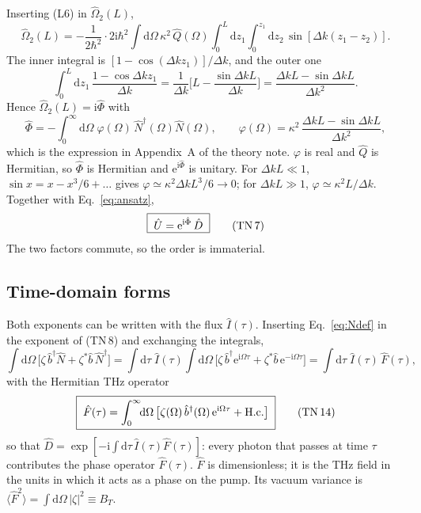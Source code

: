 \documentclass[aps,pra,onecolumn,notitlepage,11pt,amsmath,amssymb,nofootinbib]{revtex4-2}
\newcommand{\Nop}{\hat N}
\newcommand{\Iop}{\hat I}
\newcommand{\Qop}{\hat Q}
\newcommand{\dd}{\mathrm{d}}
\newcommand{\ee}{\mathrm{e}}
\newcommand{\ii}{\mathrm{i}}
\newcommand{\TN}[1]{\text{TN\,#1}}
\begin{document}
Inserting (L6) in $\hat\Omega_2(L)$,
\begin{equation}
\hat\Omega_2(L)=-\frac{1}{2\hbar^2}\cdot2\ii\hbar^2\!\int\!\dd\Omega\,\kappa^2\,\Qop(\Omega)
\int_0^L\!\!\dd z_1\!\int_0^{z_1}\!\!\dd z_2\,\sin[\Delta k(z_1-z_2)] .
\end{equation}
The inner integral is $[1-\cos(\Delta kz_1)]/\Delta k$, and the outer one
\begin{equation}
\int_0^L\!\!\dd z_1\,\frac{1-\cos\Delta kz_1}{\Delta k}
=\frac{1}{\Delta k}\Big[L-\frac{\sin\Delta kL}{\Delta k}\Big]
=\frac{\Delta kL-\sin\Delta kL}{\Delta k^2}.
\end{equation}
Hence $\hat\Omega_2(L)=\ii\hat\Phi$ with
\begin{equation}
\hat\Phi=-\int_0^\infty\!\!\dd\Omega\;\varphi(\Omega)\,\Nop^\dagger(\Omega)\Nop(\Omega),
\qquad
\varphi(\Omega)=\kappa^2\,\frac{\Delta kL-\sin\Delta kL}{\Delta k^2},
\label{eq:Phi}
\end{equation}
which is the expression in Appendix~A of the theory note. $\varphi$ is real
and $\Qop$ is Hermitian, so $\hat\Phi$ is Hermitian and $\ee^{\ii\hat\Phi}$ is
unitary. For $\Delta kL\ll1$, $\sin x=x-x^3/6+\dots$ gives
$\varphi\simeq\kappa^2\Delta kL^3/6\to0$; for $\Delta kL\gg1$,
$\varphi\simeq\kappa^2L/\Delta k$. Together with Eq.~\eqref{eq:ansatz},
\begin{equation}
\boxed{\;\hat U=\ee^{\ii\hat\Phi}\,\hat D\;}
\tag{\TN{7}}
\end{equation}
The two factors commute, so the order is immaterial.

\subsection{Time-domain forms}
\label{sec:time}

Both exponents can be written with the flux $\Iop(\tau)$. Inserting
Eq.~\eqref{eq:Ndef} in the exponent of (TN\,8) and exchanging the integrals,
\begin{equation}
\int\!\dd\Omega\,\big[\zeta\,\hat b^\dagger\Nop+\zeta^*\hat b\,\Nop^\dagger\big]
=\int\!\dd\tau\;\Iop(\tau)\int\!\dd\Omega\,
\big[\zeta\,\hat b^\dagger\ee^{\ii\Omega\tau}+\zeta^*\hat b\,\ee^{-\ii\Omega\tau}\big]
=\int\!\dd\tau\;\Iop(\tau)\,\hat F(\tau),
\label{eq:Y}
\end{equation}
with the Hermitian THz operator
\begin{equation}
\boxed{\;\hat F(\tau)=\int_0^\infty\!\!\dd\Omega\,
\big[\zeta(\Omega)\,\hat b^\dagger(\Omega)\,\ee^{\ii\Omega\tau}+\mathrm{H.c.}\big]\;}
\tag{\TN{14}}
\end{equation}
so that $\hat D=\exp[-\ii\int\dd\tau\,\Iop(\tau)\hat F(\tau)]$: every photon
that passes at time $\tau$ contributes the phase operator $\hat F(\tau)$.
$\hat F$ is dimensionless; it is the THz field in the units in which it acts
as a phase on the pump. Its vacuum variance is
$\langle\hat F^2\rangle=\int\dd\Omega\,|\zeta|^2\equiv B_T$.
\end{document}
